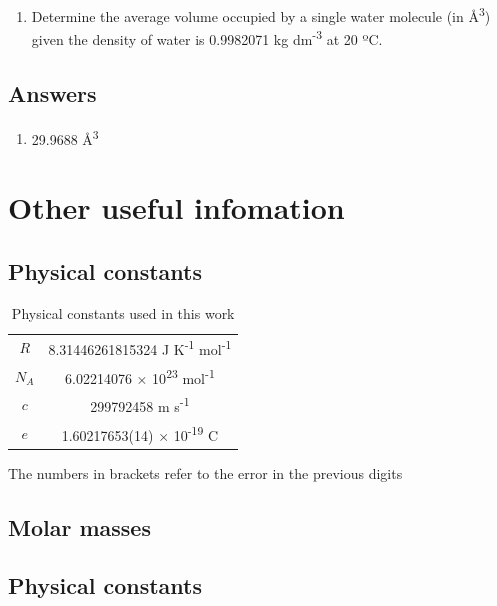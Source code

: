 \documentclass[
]{book}
\providecommand{\tightlist}{%
  \setlength{\itemsep}{0pt}\setlength{\parskip}{0pt}}
\begin{document}
\begin{enumerate}
\def\labelenumi{\arabic{enumi}.}
\tightlist
\item
  Determine the average volume occupied by a single water molecule (in Å\textsuperscript{3}) given the density of water is 0.9982071 kg dm\textsuperscript{-3} at 20 ºC.
\end{enumerate}

\hypertarget{answers}{%
\section{Answers}\label{answers}}

\begin{enumerate}
\def\labelenumi{\arabic{enumi}.}
\tightlist
\item
  29.9688 Å\textsuperscript{3}
\end{enumerate}

\hypertarget{other-useful-infomation}{%
\chapter{Other useful infomation}\label{other-useful-infomation}}

\hypertarget{physical-constants}{%
\section{Physical constants}\label{physical-constants}}

\begin{longtable}[]{@{}cc@{}}
\caption{Physical constants used in this work\label{tab:physicalconst}}\tabularnewline
\toprule
\endhead
\(R\) & 8.31446261815324 J K\textsuperscript{-1} mol\textsuperscript{-1}\tabularnewline
\(N_A\) & 6.02214076 × 10\textsuperscript{23} mol\textsuperscript{-1}\tabularnewline
\(c\) & 299792458 m s\textsuperscript{-1}\tabularnewline
\(e\) & 1.60217653(14) × 10\textsuperscript{-19} C\tabularnewline
\bottomrule
\end{longtable}

The numbers in brackets refer to the error in the previous digits

\hypertarget{molar-masses}{%
\section{Molar masses}\label{molar-masses}}

\hypertarget{physical-constants-1}{%
\section{Physical constants}\label{physical-constants-1}}
\end{document}
